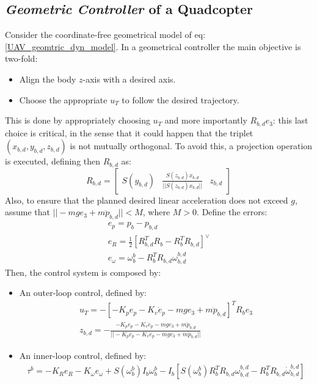 \subsection{\textit{Geometric Controller} of a Quadcopter}
Consider the coordinate-free geometrical model of eq:\ref{UAV_geomtric_dyn_model}. In a geometrical controller the main objective is two-fold:
\begin{itemize}
    \item Align the body $z$-axis with a desired axis.
    \item Choose the appropriate $u_T$ to follow the desired trajectory.
\end{itemize}
This is done by appropriately choosing $u_T$ and more importantly $R_{b,d}e_3$: this last choice is critical, in the sense that it could happen that the triplet $(x_{b,d},y_{b,d},z_{b,d})$ is not mutually orthogonal. To avoid this, a projection operation is executed, defining then $R_{b,d}$ as:
\begin{equation}\label{UAV_geometric_control_desired_z}
    R_{b,d}=
    \begin{bmatrix}
        S(y_{b,d}) & \frac{S(z_{b,d})x_{b,d}}{||S(z_{b,d})x_{b,d}||} & z_{b,d}
    \end{bmatrix}
\end{equation}
Also, to ensure that the planned desired linear acceleration does not exceed $g$, assume that $||-mge_3+m\ddot{p}_{b,d}||<M$, where $M>0$.
Define the errors:
\begin{gather}\label{UAV_geometric_controller_errors}
    e_p=p_b-p_{b,d}\\
    e_{R}=\frac{1}{2}\left[R_{b,d}^{T}R_{b}-R_{b}^{T}R_{b,d}\right]^{\vee}\\
    e_{\omega}=\omega_{b}^{b}-R_{b}^{T}R_{b,d}\omega_{b,d}^{b,d}
\end{gather}
Then, the control system is composed by:
\begin{itemize}
    \item An outer-loop control, defined by:
    \begin{gather}\label{UAV_geometric_controller_outer_loop_u}
        u_{T}=-\left[-K_pe_p-K_v\dot{e}_p-mge_3+m\ddot{p}_{b,d}\right]^{T}R_be_3\\
        z_{b,d}=-\frac{-K_pe_p-K_v\dot{e}_p-mge_3+m\ddot{p}_{b,d}}{||-K_pe_p-K_v\dot{e}_p-mge_3+m\ddot{p}_{b,d}||}
    \end{gather}
    \item An inner-loop control, defined by:
    \begin{gather*}
        \tau^b=-K_Re_R-K_{\omega}e_{\omega}+S\left(\omega_{b}^{b}\right)I_b\omega_{b}^{b}-I_b\left[ S\left(\omega_{b}^{b}\right)R_{b}^{T}R_{b,d}\omega_{b,d}^{b,d}-R_{b}^{T}R_{b,d}\dot{\omega}_{b,d}^{b,d} \right]
    \end{gather*}
\end{itemize}
